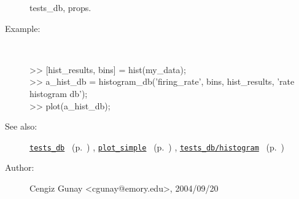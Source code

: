 \begin{description}
	tests\_db, props.
%
\item[Example:]~
\begin{lyxcode} >> [hist\_results, bins] = hist(my\_data);
\\%
 >> a\_hist\_db = histogram\_db('firing\_rate', bins, hist\_results, 'rate histogram db');
\\%
 >> plot(a\_hist\_db);
\\%
\end{lyxcode}
%
\item[See also:]%
\hyperlink{ref_tests_db}{\texttt{tests\_db}}%
\ (p.~\pageref{ref_tests_db})%
%
, \hyperlink{ref_plot_simple}{\texttt{plot\_simple}}%
\ (p.~\pageref{ref_plot_simple})%
%
, \hyperlink{ref_tests_db__histogram}{\texttt{tests\_db/histogram}}%
\ (p.~\pageref{ref_tests_db__histogram})%
%
%
\item[Author:]%
Cengiz Gunay <cgunay@emory.edu>, 2004/09/20
%
\end{description}
\methodline%
